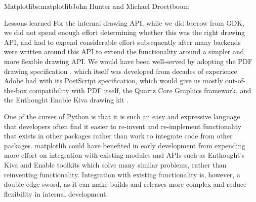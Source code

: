\begin{aosachapter}{Matplotlib}{s:matplotlib}{John Hunter and Michael Droettboom}
\begin{aosasect1}{Lessons learned}
For the internal drawing API, while we did borrow from GDK, we did not
spend enough effort determining whether this was the right drawing
API, and had to expend considerable effort subsequently after many
backends were written around this API to extend the functionality
around a simpler and more flexible drawing API.  We would have been
well-served by adopting the PDF drawing specification \cite{bib:pdf},
which itself was developed from decades of experience Adobe had with
its PostScript specification, which would give us mostly
out-of-the-box compatibility with PDF itself, the Quartz Core Graphics
framework, and the Enthought Enable Kiva drawing kit \cite{bib:kiva}.

One of the curses of Python is that it is such an easy and expressive
language that developers often find it easier to re-invent and
re-implement functionality that exists in other packages rather than
work to integrate code from other packages.  matplotlib could have
benefited in early development from expending more effort on
integration with existing modules and APIs such as Enthought's Kiva
and Enable toolkits which solve many similar problems, rather than
reinventing functionality.  Integration with existing functionality
is, however, a double edge sword, as it can make builds and releases
more complex and reduce flexibility in internal development.

\end{aosasect1}
\end{aosachapter}
